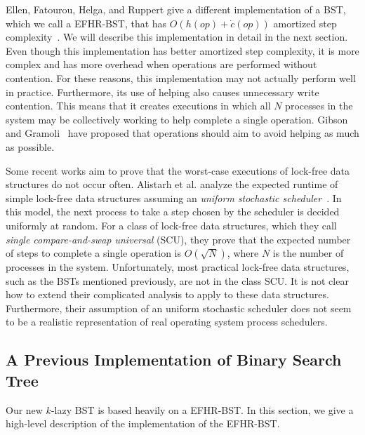 \documentclass[letterpaper,twocolumn]{article}
\begin{document}
Ellen, Fatourou, Helga, and Ruppert give a different implementation of a BST, which we call a EFHR-BST, that has $O(h(op) + \dot{c}(op))$ amortized step complexity~\cite{EllenFHR13}. We will describe this implementation in detail in the next section. Even though this implementation has better amortized step complexity, it is more complex and has more overhead when operations are performed without contention. For these reasons, this implementation may not actually perform well in practice. Furthermore, its use of helping also causes unnecessary write contention. This means that it creates executions in which all $N$ processes in the system may be collectively working to help complete a single operation. Gibson and Gramoli~\cite{GibsonG15} have proposed that operations should aim to avoid helping as much as possible. 

Some recent works aim to prove that the worst-case executions of lock-free data structures do not occur often. Alistarh et al. analyze the expected runtime of simple lock-free data structures assuming an \textit{uniform stochastic scheduler}~\cite{AlistarhCS14}. In this model, the next process to take a step chosen by the scheduler is decided uniformly at random. For a class of lock-free data structures, which they call \textit{single compare-and-swap universal} (SCU), they prove that the expected number of steps to complete a single operation is $O(\sqrt{N})$, where $N$ is the number of processes in the system. Unfortunately, most practical lock-free data structures, such as the BSTs mentioned previously, are not in the class SCU. It is not clear how to extend their complicated analysis to apply to these data structures. Furthermore, their assumption of an uniform stochastic scheduler does not seem to be a realistic representation of real operating system process schedulers.

\subsection{A Previous Implementation of Binary Search Tree}\label{section_bst_EFHR}
Our new $k$-lazy BST is based heavily on a EFHR-BST. In this section, we give a high-level description of the implementation of the EFHR-BST. 
\end{document}
